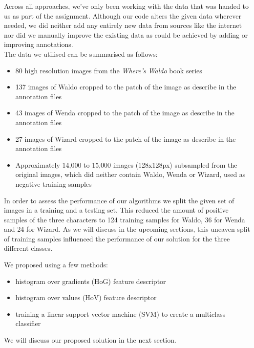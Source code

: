 \documentclass[11pt]{article}
\begin{document}
Across all approaches, we've only been working with the data that was handed to us as part of the assignment. Although our code alters the given data wherever needed, we did neither add any entirely new data from sources like the internet nor did we manually improve the existing data as could be achieved by adding or improving annotations.\\

The data we utilised can be summarised as follows:

\begin{itemize}
    \item 80 high resolution images from the \textit{Where's Waldo} book series
    \item 137 images of Waldo cropped to the patch of the image as describe in the annotation files
    \item 43 images of Wenda cropped to the patch of the image as describe in the annotation files
    \item 27 images of Wizard cropped to the patch of the image as describe in the annotation files
    \item Approximately 14,000 to 15,000 images (128x128px) subsampled from the original images, which did neither contain Waldo, Wenda or Wizard, used as negative training samples
\end{itemize}

In order to assess the performance of our algorithms we split the given set of images in a training and a testing set. This reduced the amount of positive samples of the three characters to 124 training samples for Waldo, 36 for Wenda and 24 for Wizard. As we will discuss in the upcoming sections, this uneaven split of training samples influenced the performance of our solution for the three different classes. 

We proposed using a few methods:

\begin{itemize}
    \item histogram over gradients (HoG) feature descriptor
    \item histogram over values (HoV) feature descriptor
    \item training a linear support vector machine (SVM) to create a multiclass-classifier
\end{itemize}

We will discuss our proposed solution in the next section.\\
\end{document}
